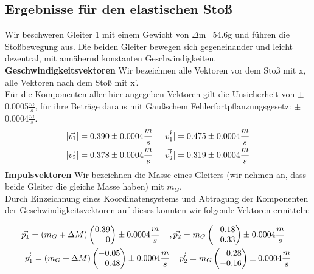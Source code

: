 \documentclass{article}
\begin{document}
\subsection{Ergebnisse für den elastischen Stoß}

Wir beschweren Gleiter 1 mit einem Gewicht von $\Delta$m=54.6g und führen die Stoßbewegung aus. Die beiden Gleiter bewegen sich gegeneinander und leicht dezentral, mit annähernd konstanten Geschwindigkeiten. \\

\textbf{Geschwindigkeitsvektoren}
Wir bezeichnen alle Vektoren vor dem Stoß mit x, alle Vektoren nach dem Stoß mit x'. \\
Für die Komponenten aller hier angegeben Vektoren gilt die Unsicherheit von $\pm$0.0005$\frac{m}{s}$, für ihre Beträge daraus mit Gaußschem Fehlerfortpflanzungsgesetz: $\pm$0.0004$\frac{m}{s}$.
\begin{gather}
|\vec{v_1}|=0.390 \pm 0.0004 \frac{m}{s} \hspace{0.4cm}
|\vec{v_1'}|=0.475 \pm 0.0004 \frac{m}{s}
\\
|\vec{v_2}|=0.378 \pm 0.0004 \frac{m}{s} \hspace{0.4cm}
|\vec{v_2'}|=0.319 \pm 0.0004 \frac{m}{s}
\end{gather}
\textbf{Impulsvektoren}
Wir bezeichnen die Masse eines Gleiters (wir nehmen an, dass beide Gleiter die gleiche Masse haben) mit $m_G$. \\
Durch Einzeichnung eines Koordinatensystems und Abtragung der Komponenten der Geschwindigkeitsvektoren auf dieses konnten wir folgende Vektoren ermitteln:
\begin{center}


\begin{gather*}
\vec{p_1}=(m_G+\Delta M)
\begin{pmatrix*}[r]
0.39 \\ 0
\end{pmatrix*}\pm 0.0004 \frac{m}{s} \hspace{0.4cm}
, \vec{p_2}= 
m_G\begin{pmatrix*}[r]
-0.18 \\ 0.33
\end{pmatrix*}\pm 0.0004 \frac{m}{s}\hspace{0.4cm}
\\
\vec{p_1'}=
(m_G+\Delta M)\begin{pmatrix*}[r]
-0.05 \\ 0.48
\end{pmatrix*}\pm 0.0004  \frac{m}{s}\hspace{0.4cm}
\vec{p_2'}=m_G\begin{pmatrix*}[r]
0.28 \\ -0.16
\end{pmatrix*} \pm 0.0004 \frac{m}{s}
\end{gather*}
\end{center}
\end{document}
